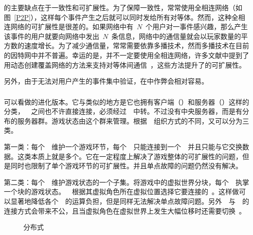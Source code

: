 {\pa}的主要缺点在于一致性和可扩展性。为了保障一致性，{\pa}常常使用全相连网络（如图~\ref{P2P}），这样每个事件产生之后就可以同时发给所有对等体。然而，这种全相连网络的可扩展性是很差的。如果网络中有~$N$~个用户对一事件感兴趣，那么产生该事件的用户就要向网络中发出~$N$~条信息，网络中的通信量就会以玩家数量的平方数的速度增长。为了减少通信量，{\pa}常常需要依靠多播技术，然而多播技术在目前的因特网中并不普遍。幸运的是，{\pa}并不一定要使用全相连网络，许多文献中提到了用动态创建覆盖网络的方法来支持对等体间通信~\cite{p2p1, p2p2}，这些方法提升了{\pa}的可扩展性。

另外，由于无法对用户产生的事件集中验证，在{\pa}中作弊会相对容易。

\subsubsection{\da}

{\da}可以看做{\csa}的进化版本。它与{\csa}类似的地方是它也拥有客户端（\ioc）和服务器（\gss）这样的分类，~\ioc~之间也不许直接连接，必须经过~\gss~中转。不过{\da}没有中央服务器，而是有分布的服务器群。游戏状态由这个群来管理。根据~\gss~组织方式的不同，{\da}又可以分为三类。

第一类：每个~\gss~维护一个游戏环节，每个~\ioc~只能连接到一个~\gss~并且只能与它交换数据。这类{\da}本质上就是多个{\csa}。它在一定程度上解决了游戏整体的可扩展性的问题，但是同时也限制了单个游戏环节的可扩展性。并且单点故障的问题仍然没有解决。

第二类：每个~\gss~维护游戏状态的一个子集。将游戏中的虚拟世界分块，每个~\gss~执掌一个块的游戏状态。~\ioc~根据其虚拟角色所在虚拟位置选择它要连接的~\gss。这样做可以显著地降低各个~\gss~的运算负担，但是同样无法解决单点故障问题。另外~\ioc~与~\gss~的连接方式会带来不公，且当虚拟角色在虚拟世界上发生大幅位移时还需要切换~\gss。

\begin{figure}[htbp]
\begin{center}
\caption{分布式}
\label{distributed}
\end{center}
\end{figure}

